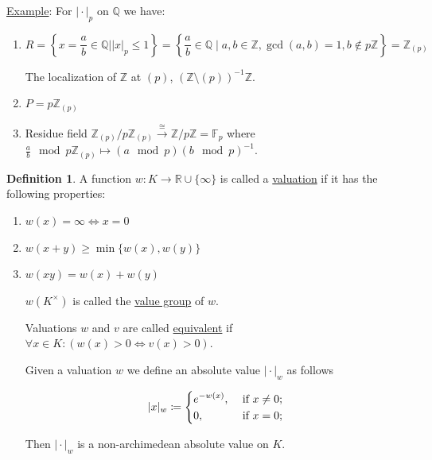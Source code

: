 \documentclass[openany]{amsbook}
\numberwithin{section}{chapter}
\theoremstyle{definition}
\newtheorem*{definition}{Definition}
\begin{document}
\underline{Example}: For \(\vert \cdot \vert _ p\) on \(\mathbb{Q}\) we have:

\begin{enumerate}[label=\roman*)]
    \item 
    \[
        R = \left\{ x = \frac{a}{b} \in \mathbb{Q} \mid \vert x \vert _ p \leq 1 \right\} = \left\{ \frac{a}{b} \in \mathbb{Q} \mid a,b\in\mathbb{Z} ,\gcd(a,b)=1, b\notin p\mathbb{Z} \right\} = \mathbb{Z}_{(p)}
    \]

    The localization of \(\mathbb{Z}\) at \((p)\), \((\mathbb{Z} \setminus (p))^{-1} \mathbb{Z}\).

    \item \(P = p \mathbb{Z}_{(p)}\) 
    \item Residue field \(\mathbb{Z}_{(p)} / p \mathbb{Z}_{(p)} \overset{\cong}{\to} \mathbb{Z} / p\mathbb{Z} = \mathbb{F}_p\) where \(\frac{a}{b}\mod{p \mathbb{Z}_{(p)}} \mapsto (a \mod p)(b\mod p)^{-1}\).

\end{enumerate}

\begin{definition}
    A function \(w: K \to \mathbb{R} \cup \{ \infty \}\) is called a \underline{valuation} if it has the following properties:

    \begin{enumerate}[label=\roman*)]
        \item \(w(x) = \infty \iff x = 0\) 
        \item \(w(x+y) \geq \min \{ w(x), w(y) \} \) 
        \item \(w(xy) = w(x) + w(y)\)
        
        \(w(K^\times)\) is called the \underline{value group} of \(w\).

        Valuations \(w\) and \(v\) are called \underline{equivalent} if \(\forall x\in K: (w(x) > 0 \iff v(x) > 0)\).

        Given a valuation \(w\) we define an absolute value \(\vert \cdot \vert_w\) as follows

        \[
            \vert x \vert _ w \coloneqq \begin{dcases}
                e^{-w(x)}, &\text{ if } x\neq 0 ;\\
                0, &\text{ if } x = 0 ;
            \end{dcases}
        \]

        Then \(\vert \cdot \vert _w\) is a non-archimedean absolute value on \(K\).
    \end{enumerate} 
\end{definition}
\end{document}
